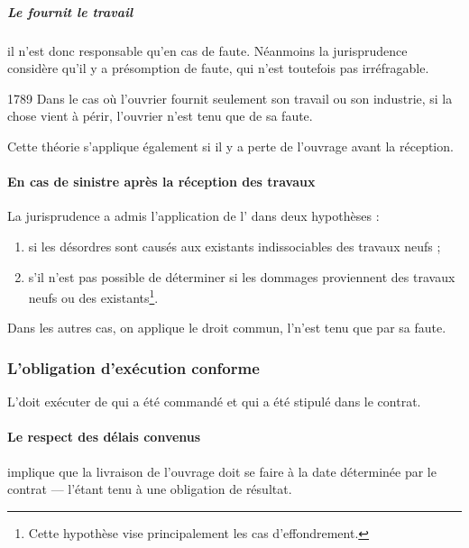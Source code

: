 				\subparagraph{Le \lo fournit le travail} il n'est donc responsable qu'en cas de faute. Néanmoins la jurisprudence considère qu'il y a présomption de faute, qui n'est toutefois pas irréfragable.

				\begin{citationArticleCciv}{1789}
					Dans le cas où l'ouvrier fournit seulement son travail ou son industrie, si la chose vient à périr, l'ouvrier n'est tenu que de sa faute.
				\end{citationArticleCciv}

				Cette théorie s'applique également si il y a perte de l'ouvrage avant la réception.

				\paragraph{En cas de sinistre après la réception des travaux} La jurisprudence a admis l'application de l' dans deux hypothèses :
				\begin{enumerate}
					\item si les désordres sont causés aux existants indissociables des travaux neufs ;

					\item s'il n'est pas possible de déterminer si les dommages proviennent des travaux neufs ou des existants\footnote{Cette hypothèse vise principalement les cas d'effondrement.}.
				\end{enumerate}

				Dans les autres cas, on applique le droit commun, l'\E n'est tenu que par sa faute.

			\subsubsection{L'obligation d'exécution conforme}

				L'\E doit exécuter de qui a été commandé et qui a été stipulé dans le contrat.

				\paragraph{Le respect des délais convenus} implique que la livraison de l'ouvrage doit se faire à la date déterminée par le contrat --- l'\E étant tenu à une obligation de résultat.

